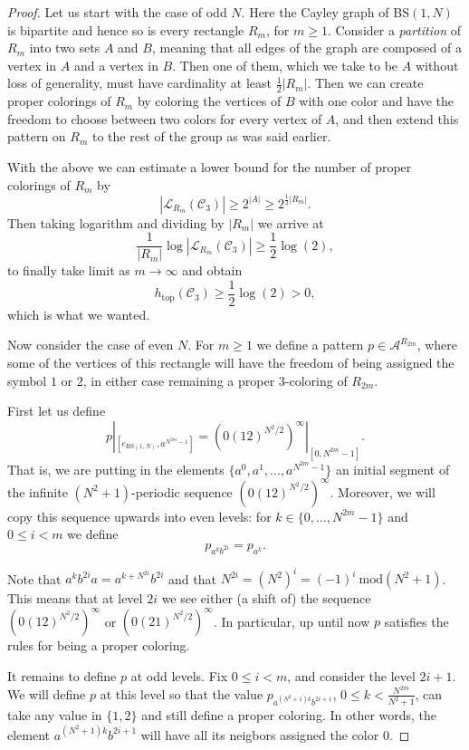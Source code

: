 \documentclass[letterpaper,11pt,reqno]{amsart}
\theoremstyle{plain}
\theoremstyle{definition}
\newcommand{\BS}[1][N]{\mathrm{BS}(1,#1)}
\def\htop{h_{\mathrm{top}}}
\begin{document}
\begin{proof}
	Let us start with the case of odd $N$. Here the Cayley graph of $\BS$ is bipartite and hence so is every rectangle $R_m$, for $m\ge 1$. Consider a \textit{partition} of $R_m$ into two sets $A$ and $B$, meaning that all edges of the graph are composed of a vertex in $A$ and a vertex in $B$. Then one of them, which we take to be $A$ without loss of generality, must have cardinality at least $\frac{1}{2}|R_m|$. Then we can create proper colorings of $R_m$ by coloring the vertices of $B$ with one color and have the freedom to choose between two colors for every vertex of $A$, and then extend this pattern on $R_m$ to the rest of the group as was said earlier.
	
	With the above we can estimate a lower bound for the number of proper colorings of $R_m$ by
	$$
	|\mathcal{L}_{R_m}(\mathcal{C}_3)|\ge 2^{|A|}\ge 2^{\frac{1}{2}|R_m|}.
	$$
	Then taking logarithm and dividing by $|R_m|$ we arrive at
	$$
	\frac{1}{|R_m|}\log |\mathcal{L}_{R_m}(\mathcal{C}_3)| \ge \frac{1}{2}\log (2),
	$$
	to finally take limit as $m\to \infty$ and obtain
	$$
	\htop(\mathcal{C}_3)\ge \frac{1}{2}\log(2)>0,
	$$
	which is what we wanted.
	
	
	Now consider the case of even $N$. For $m\ge 1$ we define a pattern $p\in \mathcal{A}^{R_{2m}}$, where some of the vertices of this rectangle will have the freedom of being assigned the symbol $1$ or $2$, in either case remaining a proper $3$-coloring of $R_{2m}$.
	
	First let us define 
	$$
	p|_{[e_{\BS},a^{N^{2m}-1}]}=(0(12)^{N^2/2})^{\infty}|_{[0,N^{2m}-1]}.
	$$
	That is, we are putting in the elements $\{a^{0},a^{1},\ldots,a^{N^{2m}-1}\}$ an initial segment of the infinite $(N^2+1)$-periodic sequence $\left(0(12)^{N^2/2}\right)^{\infty}$. Moreover, we will copy this sequence upwards into even levels: for $k\in \{0,\ldots,N^{2m}-1\}$ and $0\le i<m$ we define
	$$
	p_{a^{k}b^{2i}}=p_{a^k}.
	$$
	
	Note that $a^kb^{2i}a=a^{k+N^{2i}}b^{2i}$ and that $N^{2i}=(N^{2})^i=(-1)^{i}\ \mathrm{mod}(N^2+1)$. This means that at level $2i$ we see either (a shift of) the sequence $(0(12)^{N^2/2})^{\infty}$ or $(0(21)^{N^2/2})^{\infty}$. In particular, up until now $p$ satisfies the rules for being a proper coloring.
	
	It remains to define $p$ at odd levels. Fix $0\le i<m$, and consider the level $2i+1$. We will define $p$ at this level so that the value $p_{a^{(N^2+1)k}b^{2i+1}}$, $0\le k<\frac{N^{2m}}{N^2+1}$, can take any value in $\{1,2\}$ and still define a proper coloring. In other words, the element $a^{(N^2+1)k}b^{2i+1}$ will have all its neigbors assigned the color $0$.
	

\end{proof}
\end{document}

